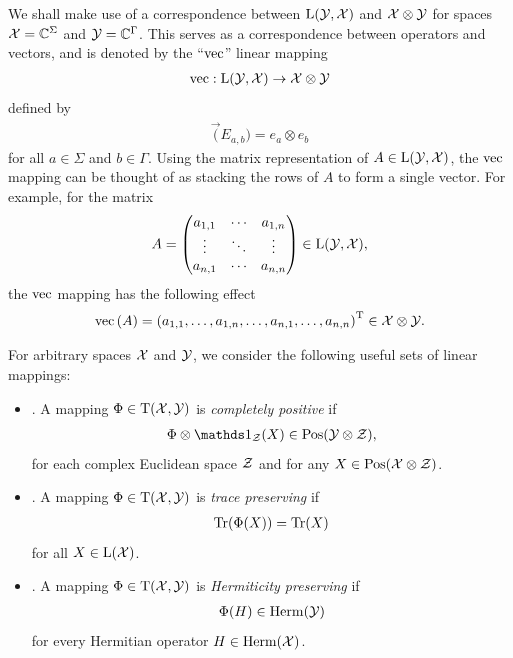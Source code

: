 We shall make use of a correspondence between $\Lin(\Y,\X)$ and $\X \otimes \Y$ for spaces $\X = \complex^{\Sigma}$ and $\Y = \complex^{\Gamma}$. This serves as a correspondence between operators and vectors, and is denoted by the ``$\vec$'' linear mapping
\begin{align}
	\vec: \Lin(\Y,\X) \rightarrow \X \otimes \Y
\end{align} 
defined by 
\begin{align}
	\vec(E_{a,b}) = e_a \otimes e_b
\end{align}
for all $a \in \Sigma$ and $b \in \Gamma$. Using the matrix representation of $A \in \Lin(\Y,\X)$, the $\vec$ mapping can be thought of as stacking the rows of $A$ to form a single vector. For example, for the matrix
\begin{align}
	A = \begin{pmatrix} a_{1,1} & \cdots & a_{1,n} \\ \vdots & \ddots & \vdots \\ a_{n,1} & \cdots & a_{n,n} \end{pmatrix} \in \Lin(\Y,\X),
\end{align}
the $\vec$ mapping has the following effect
\begin{align}
	\vec \left( A \right) = \left( a_{1,1}, \ldots, a_{1,n}, \ldots, a_{n,1}, \ldots, a_{n,n} \right)^{\Trans} \in \X \otimes \Y.
\end{align}

For arbitrary spaces $\X$ and $\Y$, we consider the following useful sets of linear mappings:
\begin{itemize}
	\item {}. A mapping $\Phi \in \Trans(\X,\Y)$ is \emph{completely positive} if
\begin{align}
	\Phi \otimes \I_{\Z} (X) \in \Pos(\Y \otimes \Z),
\end{align}
for each complex Euclidean space $\Z$ and for any $X \in \Pos(\X \otimes \Z)$.
	\item {}. A mapping $\Phi \in \Trans(\X,\Y)$ is \emph{trace preserving} if
\begin{align}
	\tr(\Phi(X)) = \tr(X)
\end{align}
for all $X \in \Lin(\X)$. 
	\item {}. A mapping $\Phi \in \Trans(\X,\Y)$ is \emph{Hermiticity preserving} if
\begin{align}
	\Phi(H) \in \Herm(\Y)
\end{align}
for every Hermitian operator $H \in \Herm(\X)$. 
\end{itemize}


